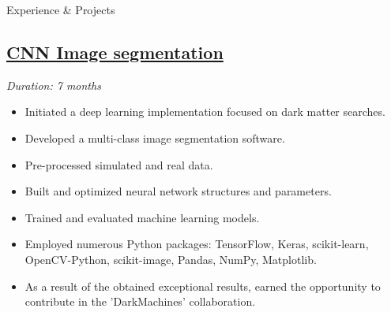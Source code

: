 \documentclass{resume}
\begin{document}
\begin{rSection}{\large{Experience \& Projects {\href{https://github.com/aritzLizoain}{}}}}

\begin{adjustwidth}{-6mm}{0pt}
\vspace{-8pt}
 \subsection*{\href{https://github.com/aritzLizoain/CNN-Image-segmentation}{CNN Image segmentation}}
\vspace{-8pt}
\textit{Duration: 7 months}
\end{adjustwidth} 
\begin{adjustwidth}{-3.5mm}{0pt}
\begin{itemize}
    \item Initiated a deep learning implementation focused on dark matter searches.
    \item Developed a multi-class image segmentation software.
    \item Pre-processed simulated and real data.
    \item Built and optimized neural network structures and parameters. 
    \item Trained and evaluated machine learning models.
    \item Employed numerous Python packages: TensorFlow, Keras, scikit-learn, OpenCV-Python, scikit-image, Pandas, NumPy, Matplotlib.
    \item As a result of the obtained exceptional results, earned the opportunity to contribute in the 'DarkMachines' collaboration.
\end{itemize}
\end{adjustwidth}

\begin{adjustwidth}{-6mm}{0pt}
\vspace{-8pt}

\end{adjustwidth}
\end{rSection}
\end{document}
